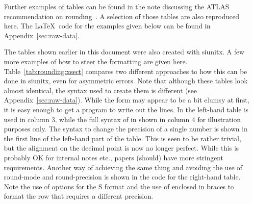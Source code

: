 \documentclass[UKenglish,texlive=2016]{\ATLASLATEXPATH atlasdoc}
\begin{document}
Further examples of tables can be found in the note discussing the ATLAS recommendation on rounding~\cite{atlas-rounding}.
A selection of those tables are also reproduced here.
The \LaTeX\ code for the examples given below can be found in
Appendix~\cref{sec:raw-data}.

The tables shown earlier in this document were also created with \textsf{siunitx}.
A few more examples of how to steer the formatting are given here.
Table~\ref{tab:rounding:xsect} compares two different approaches
to how this can be done  in \textsf{siunitx}, even for asymmetric errors.  Note that although these
tables look almost identical, the syntax used to create them is different (see Appendix~\ref{sec:raw-data}).
While the form may appear to be a bit clumsy at first, it is easy enough to get a
program to write out the lines. In the left-hand table
 is used in column 3, while the full syntax of 
in shown in column 4 for illustration purposes only.  The syntax
to change the precision of a single number is shown in the first line of
the left-hand part of the table. This is seen to be rather
trivial, but the alignment on the decimal point is now no longer
perfect. While this is probably OK for internal notes etc., papers
(should) have more stringent requirements. Another way of achieving
the same thing and avoiding the use of \textsf{round-mode} and
\textsf{round-precision} is shown in the code for the right-hand table. Note the
use of options for the \textsf{S} format and the use of  enclosed
in braces to format the row that requires a different precision.
\end{document}
